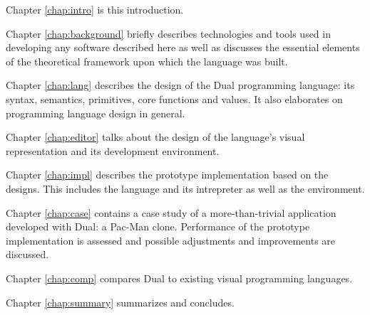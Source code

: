 Chapter \ref{chap:intro} is this introduction.

Chapter \ref{chap:background} briefly describes technologies and tools used in developing any software described here as well as discusses the essential elements of the theoretical framework upon which the language was built.

Chapter \ref{chap:lang} describes the design of the Dual programming language: its syntax, semantics, primitives, core functions and values. It also elaborates on programming language design in general.

Chapter \ref{chap:editor} talks about the design of the language's visual representation and its development environment. 

Chapter \ref{chap:impl} describes the prototype implementation based on the designs. This includes the language and its intrepreter as well as the environment.

Chapter \ref{chap:case} contains a case study of a more-than-trivial application developed with Dual: a Pac-Man clone. Performance of the prototype implementation is assessed and possible adjustments and improvements are discussed.

Chapter \ref{chap:comp} compares Dual to existing visual programming languages.

Chapter \ref{chap:summary} summarizes and concludes.
